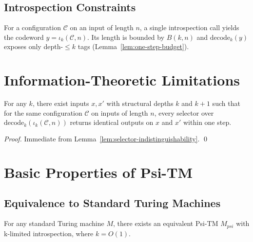 \subsection{Introspection Constraints}

\begin{definition}
For a configuration $\mathcal{C}$ on an input of length $n$, a single introspection call yields the codeword $y=\iota_k(\mathcal{C},n)$. Its length is bounded by $B(k,n)$ and $\mathrm{decode}_k(y)$ exposes only depth-$\le k$ tags (Lemma~\ref{lem:one-step-budget}).
\end{definition}

\section{Information-Theoretic Limitations}

\begin{lemma}
For any $k$, there exist inputs $x,x'$ with structural depths $k$ and $k{+}1$ such that for the same configuration $\mathcal{C}$ on inputs of length $n$, every selector over $\mathrm{decode}_k(\iota_k(\mathcal{C},n))$ returns identical outputs on $x$ and $x'$ within one step.
\end{lemma}

\begin{proof}
Immediate from Lemma~\ref{lem:selector-indistinguishability}. \qed
\end{proof}

\section{Basic Properties of Psi-TM}

\subsection{Equivalence to Standard Turing Machines}

\begin{theorem}
For any standard Turing machine $M$, there exists an equivalent Psi-TM $M_{psi}$ with k-limited introspection, where $k = O(1)$.
\end{theorem}

